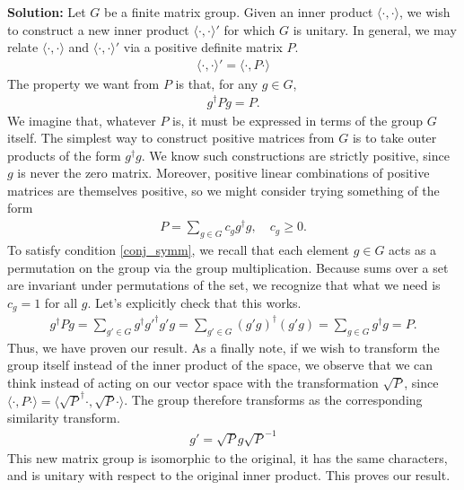 \documentclass{book}
\newcommand{\innerprod}[2]{\langle#1,#2\rangle}
\begin{document}
    \textbf{Solution:} Let $G$ be a finite matrix group. Given an inner product $\innerprod{\cdot}{\cdot}$, we wish to construct a new inner product $\innerprod{\cdot}{\cdot}'$ for which $G$ is unitary. In general, we may relate $\innerprod{\cdot}{\cdot}$ and $\innerprod{\cdot}{\cdot}'$ via a positive definite matrix $P$.
    \begin{align}
        \innerprod{\cdot}{\cdot}' = \innerprod{\cdot}{P\cdot}
    \end{align}
    The property we want from $P$ is that, for any $g\in G$,
    \begin{align} \label{conj_symm}
        g^\dagger P g = P.
    \end{align}
    We imagine that, whatever $P$ is, it must be expressed in terms of the group $G$ itself. The simplest way to construct positive matrices from $G$ is to take outer products of the form $g^\dagger g$. We know such constructions are strictly positive, since $g$ is never the zero matrix. Moreover, positive linear combinations of positive matrices are themselves positive, so we might consider trying something of the form
    \begin{align}
        P = \sum_{g\in G} c_g g^\dagger g, \quad c_g\geq 0.
    \end{align}
    To satisfy condition \eqref{conj_symm}, we recall that each element $g\in G$ acts as a permutation on the group via the group multiplication. Because sums over a set are invariant under permutations of the set, we recognize that what we need is $c_g=1$ for all $g$. Let's explicitly check that this works.
    \begin{align}
        g^\dagger P g = \sum_{g'\in G} g^\dagger g'^\dagger g' g = \sum_{g'\in G} (g'g)^\dagger (g'g) = \sum_{g\in G} g^\dagger g = P.
    \end{align}
    Thus, we have proven our result. As a finally note, if we wish to transform the group itself instead of the inner product of the space, we observe that we can think instead of acting on our vector space with the transformation $\sqrt{P}$, since $\innerprod{\cdot}{P\cdot} = \innerprod{\sqrt{P}^\dagger\cdot}{\sqrt{P}\cdot}$. The group therefore transforms as the corresponding similarity transform.
    \begin{align}
        g' = \sqrt{P}g \sqrt{P}^{-1}
    \end{align}
    This new matrix group is isomorphic to the original, it has the same characters, and is unitary with respect to the original inner product. This proves our result. 
    
\end{document}

